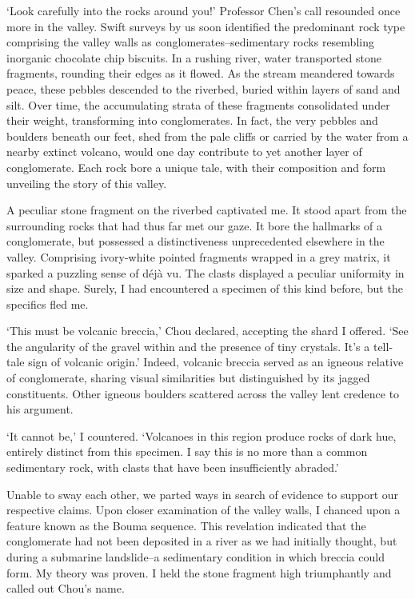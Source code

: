 \documentclass[a4paper, 12pt, mla]{homework}
\begin{document}
`Look carefully into the rocks around you!' 
Professor Chen's call resounded once more in the valley. 
Swift surveys by us soon identified the predominant rock type comprising the valley walls as conglomerates--sedimentary rocks resembling inorganic chocolate chip biscuits. 
In a rushing river, water transported stone fragments, rounding their edges as it flowed. 
As the stream meandered towards peace, these pebbles descended to the riverbed, buried within layers of sand and silt. 
Over time, the accumulating strata of these fragments consolidated under their weight, transforming into conglomerates. 
In fact, the very pebbles and boulders beneath our feet, shed from the pale cliffs or carried by the water from a nearby extinct volcano, would one day contribute to yet another layer of conglomerate. Each rock bore a unique tale, with their composition and form unveiling the story of this valley. 

A peculiar stone fragment on the riverbed captivated me. 
It stood apart from the surrounding rocks that had thus far met our gaze. 
It bore the hallmarks of a conglomerate, but possessed a distinctiveness unprecedented elsewhere in the valley. 
Comprising ivory-white pointed fragments wrapped in a grey matrix, it sparked a puzzling sense of d\'ej\`a vu. The clasts displayed a peculiar uniformity in size and shape. 
Surely, I had encountered a specimen of this kind before, but the specifics fled me.

`This must be volcanic breccia,' 
Chou declared, accepting the shard I offered. 
`See the angularity of the gravel within and the presence of tiny crystals. 
	It's a tell-tale sign of volcanic origin.' 
Indeed, volcanic breccia served as an igneous relative of conglomerate, sharing visual similarities but distinguished by its jagged constituents. 
Other igneous boulders scattered across the valley lent credence to his argument. 

`It cannot be,' I countered. 
`Volcanoes in this region produce rocks of dark hue, entirely distinct from this specimen. 
	I say this is no more than a common sedimentary rock, with clasts that have been insufficiently abraded.'

Unable to sway each other, we parted ways in search of evidence to support our respective claims. 
Upon closer examination of the valley walls, I chanced upon a feature known as the Bouma sequence. This revelation indicated that the conglomerate had not been deposited in a river as we had initially thought, but during a submarine landslide--a sedimentary condition in which breccia could form. 
My theory was proven. 
I held the stone fragment high triumphantly and called out Chou's name.
\end{document}
